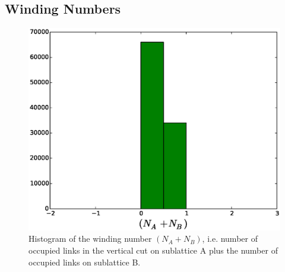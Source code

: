 \documentclass[aps,floatfix,11pt]{revtex4-1}
\begin{document}
%
%
%

\clearpage

\subsection{Winding Numbers}

\begin{figure}[h]
    \centering
    \includegraphics[width=8.5 cm]{W_vrt_NApNB_str_dmr_mdl}
    \caption{Histogram of the winding number $(N_A + N_B)$, i.e. number of occupied links in the
    vertical cut on sublattice A plus the number of occupied links on sublattice B.\label{}}
\end{figure}
\end{document}
